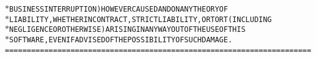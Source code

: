 {{\begin{tabbing}
{\texttt{$\ast$\hspace{6pt}BUSINESS\hspace{6pt}INTERRUPTION)\hspace{6pt}HOWEVER\hspace{6pt}CAUSED\hspace{6pt}AND\hspace{6pt}ON\hspace{6pt}ANY\hspace{6pt}THEORY\hspace{6pt}OF}}\\
{\texttt{$\ast$\hspace{6pt}LIABILITY,\hspace{6pt}WHETHER\hspace{6pt}IN\hspace{6pt}CONTRACT,\hspace{6pt}STRICT\hspace{6pt}LIABILITY,\hspace{6pt}OR\hspace{6pt}TORT\hspace{6pt}(INCLUDING}}\\
{\texttt{$\ast$\hspace{6pt}NEGLIGENCE\hspace{6pt}OR\hspace{6pt}OTHERWISE)\hspace{6pt}ARISING\hspace{6pt}IN\hspace{6pt}ANY\hspace{6pt}WAY\hspace{6pt}OUT\hspace{6pt}OF\hspace{6pt}THE\hspace{6pt}USE\hspace{6pt}OF\hspace{6pt}THIS}}\\
{\texttt{$\ast$\hspace{6pt}SOFTWARE,\hspace{6pt}EVEN\hspace{6pt}IF\hspace{6pt}ADVISED\hspace{6pt}OF\hspace{6pt}THE\hspace{6pt}POSSIBILITY\hspace{6pt}OF\hspace{6pt}SUCH\hspace{6pt}DAMAGE.}}\\
{\texttt{======================================================================}}\\

\end{tabbing}}}
